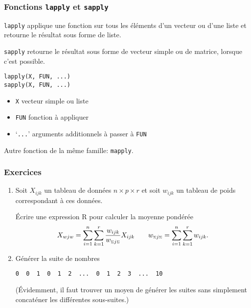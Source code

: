 \begin{frame}[fragile]
  \frametitle{Fonctions \texttt{lapply} et \texttt{sapply}}

  \texttt{lapply} applique une fonction sur tous les éléments d'un
  \alert{vecteur} ou d'une \alert{liste} et retourne le résultat sous
  forme de liste.

  \texttt{sapply} retourne le résultat sous forme de vecteur simple ou
  de matrice, lorsque c'est possible.
  \begin{Schunk}
\begin{lstlisting}
lapply(X, FUN, ...)
sapply(X, FUN, ...)
\end{lstlisting}
  \end{Schunk}
  \begin{itemize}
  \item \texttt{X} vecteur simple ou liste
  \item \texttt{FUN} fonction à appliquer
  \item `\texttt{...}' arguments additionnels à passer à \texttt{FUN}
  \end{itemize}

  Autre fonction de la même famille: \texttt{mapply}.

  \pause
\end{frame}

\begin{frame}[fragile=singleslide]
  \frametitle{Exercices}

  \begin{enumerate}
  \item Soit $X_{ijk}$ un tableau de données $n \times p \times r$ et
    soit $w_{ijk}$ un tableau de poids correspondant à ces données.

    Écrire une expression R pour calculer la moyenne pondérée
    \begin{equation*}
      X_{wjw} = \sum_{i = 1}^n \sum_{k = 1}^r
      \frac{w_{ijk}}{w_{{\scriptscriptstyle \Sigma} j {\scriptscriptstyle \Sigma}}} X_{ijk} \qquad
      w_{{\scriptscriptstyle \Sigma} j {\scriptscriptstyle \Sigma}} = \sum_{i = 1}^n \sum_{k = 1}^r w_{ijk}.
    \end{equation*}
  \item Générer la suite de nombres
\begin{verbatim}
0  0  1  0  1  2  ...  0  1  2  3  ...  10
\end{verbatim}
    (Évidemment, il faut trouver un moyen de générer les suites sans
    simplement concaténer les différentes sous-suites.)
  \end{enumerate}
\end{frame}

